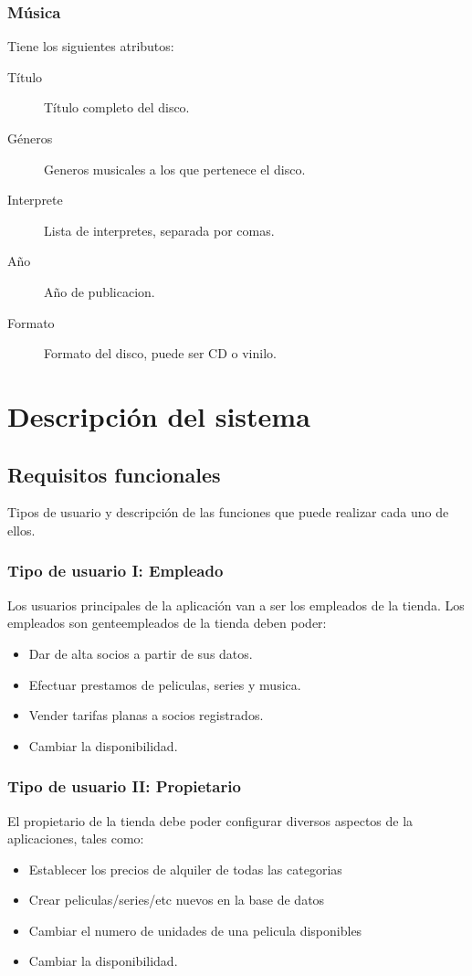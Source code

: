 \documentclass[a4paper, 12pt]{article}
\begin{document}
\subsubsection{Música}
Tiene los siguientes atributos:
\begin{description}
	\item[Título] Título completo del disco.
	\item[Géneros] Generos musicales a los que pertenece el disco.
	\item[Interprete] Lista de interpretes, separada por comas.
	\item[Año] Año de publicacion.
	\item[Formato] Formato del disco, puede ser CD o vinilo.
\end{description}

\section{Descripción del sistema}
\subsection{Requisitos funcionales}
Tipos de usuario y descripción de las funciones que puede realizar cada uno de ellos.

\subsubsection{Tipo de usuario I: Empleado}
Los usuarios principales de la aplicación van a ser los empleados de la tienda. Los empleados son genteempleados de la tienda deben poder:
\begin{itemize}
	\item Dar de alta socios a partir de sus datos.
	\item Efectuar prestamos de peliculas, series y musica.
	\item Vender tarifas planas a socios registrados.
	\item Cambiar la disponibilidad.
\end{itemize}

\subsubsection{Tipo de usuario II: Propietario}
El propietario de la tienda debe poder configurar diversos aspectos de la aplicaciones, tales como:
\begin{itemize}
	\item Establecer los precios de alquiler de todas las categorias
	\item Crear peliculas/series/etc nuevos en la base de datos
	\item Cambiar el numero de unidades de una pelicula disponibles
	\item Cambiar la disponibilidad.
\end{itemize}
\end{document}
